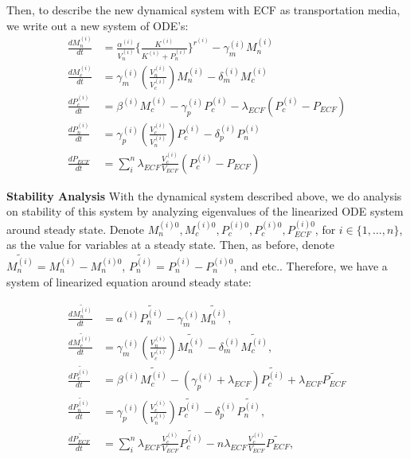 \documentclass[12pt]{article}
\renewcommand{\(}{\left (}
\renewcommand{\)}{\right )}
\begin{document}
Then, to describe the new dynamical system with ECF as transportation media, we write out a new system of ODE's:\\

\begin{align}
    \frac{dM_n^{(i)}}{dt} &= \frac{\alpha^{(i)}}{V_n^{(i)}} \{\frac{K^{(i)}}{K^{(i)} + P_n^{(i)}}\}^{r^{(i)}} - \gamma_m^{(i)} M_n^{(i)} \\
    \frac{dM_c^{(i)}}{dt} &= \gamma_m^{(i)} (\frac{V_n^{(i)}}{V_c^{(i)}}) M_n^{(i)} - \delta_m^{(i)} M_c^{(i)} \\
    \frac{dP_c^{(i)}}{dt} &= \beta^{(i)} M_c^{(i)} - \gamma_p^{(i)} P_c^{(i)} - \lambda_{ECF} (P_c^{(i)} - P_{ECF})\\
    \frac{dP_n^{(i)}}{dt} &= \gamma_p^{(i)} (\frac{V_c^{(i)}}{V_n^{(i)}}) P_c^{(i)} - \delta_p^{(i)} P_n^{(i)} \\
    \frac{dP_{ECF}}{dt} &= \sum_i^n \lambda_{ECF} \frac{V_c^{(i)}}{V_{ECF}} (P_c^{(i)} - P_{ECF})
\end{align}

\vspace{15mm}

\textbf{Stability Analysis}
With the dynamical system described above, we do analysis on stability of this system by analyzing eigenvalues of the linearized ODE system around steady state. Denote $M_n^{(i)0}, M_c^{(i)0}, P_c^{(i)0}, P_c^{(i)0}, P_{ECF}^{(i)0}$, for $i \in \{1, ..., n\}$, as the value for variables at a steady state. Then, as before, denote $\widetilde{M_n^{(i)}} = M_n^{(i)} - M_n^{(i)0}$, $\widetilde{P_n^{(i)}} = P_n^{(i)} - P_n^{(i)0}$, and etc.. Therefore, we have a system of linearized equation around steady state:

\begin{align}
    \frac{d\widetilde{M_n^{(i)}}}{dt} &= a^{(i)} \widetilde{P_n^{(i)}} - \gamma_m^{(i)} \widetilde{M_n^{(i)}}, \\
    \frac{d\widetilde{M_c^{(i)}}}{dt} &= \gamma_m^{(i)} (\frac{V_n^{(i)}}{V_c^{(i)}}) \widetilde{M_n^{(i)}} - \delta_m^{(i)} \widetilde{M_c^{(i)}}, \\
    \frac{d\widetilde{P_c^{(i)}}}{dt} &= \beta^{(i)} \widetilde{M_c^{(i)}} - (\gamma_p^{(i)} + \lambda_{ECF}) \widetilde{P_c^{(i)}} + \lambda_{ECF} \widetilde{P_{ECF}} \\
    \frac{d\widetilde{P_n^{(i)}}}{dt} &= \gamma_p^{(i)} (\frac{V_c^{(i)}}{V_n^{(i)}}) \widetilde{P_c^{(i)}} - \delta_p^{(i)} \widetilde{P_n^{(i)}}, \\
    \frac{d\widetilde{P_{ECF}}}{dt} &= \sum_i^n \lambda_{ECF} \frac{V_c^{(i)}}{V_{ECF}} \widetilde{P_c^{(i)}} - n \lambda_{ECF} \frac{V_c^{(i)}}{V_{ECF}} \widetilde{P_{ECF}},
\end{align}
\end{document}
